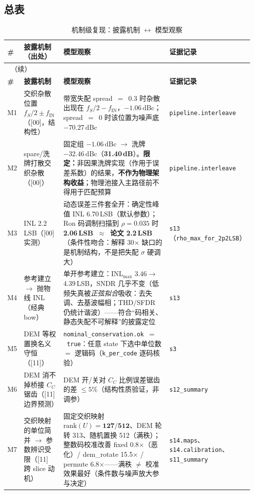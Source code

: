 \documentclass[11pt,a4paper,fontset=fandol]{ctexart}
\newcommand{\rec}[1]{\texttt{#1}}
\newcommand{\dBc}{\ensuremath{\,\mathrm{dBc}}}
\begin{document}
\subsection{总表}

\begingroup\footnotesize\sloppy
\setlength{\tabcolsep}{4pt}
\begin{longtable}{@{}p{0.7cm}p{4.6cm}p{6.2cm}p{3.4cm}@{}}
\caption{机制级复现：披露机制 $\leftrightarrow$ 模型观察}\label{tab:mech}\\
\toprule
\textbf{\#} & \textbf{披露机制（出处）} & \textbf{模型观察} & \textbf{证据记录}\\
\midrule
\endfirsthead
\multicolumn{4}{l}{\tablename~\thetable{}（续）}\\
\toprule
\textbf{\#} & \textbf{披露机制} & \textbf{模型观察} & \textbf{证据记录}\\
\midrule
\endhead
\bottomrule
\endfoot
M1 & 交织杂散位置 $f_S/2\pm f_{\mathrm{IN}}$（[00]，结构性） & 带宽失配 spread~$=$~0.3 时杂散出现在 $f_S/2-f_{\mathrm{IN}}$，$-1.06\dBc$；spread~$=$~0 时该位置为噪声底 $-70.27\dBc$ & \rec{pipeline.interleave}\\
M2 & spare/洗牌打散交织杂散（[00]） & 固定组 $-1.06\dBc$ $\to$ 洗牌 $-32.46\dBc$（\textbf{31.40\,dB}）。{\bfseries 限定：}非因果洗牌实现（作用于误差系数）的结果，\textbf{不作为物理架构收益}；物理池接入主路径前不得用于匹配预算 & \rec{pipeline.interleave}\\
M3 & INL 2.2\,LSB（[00] 实测） & 动态误差三件套全开：确定性峰值 INL 6.70\,LSB（默认参数）；Ron 码调制扫描到 $\rho=0.035$ 时 \textbf{2.06\,LSB~$\approx$~论文 2.2\,LSB}（条件性吻合：解释 30$\times$ 缺口的是机制结构，不是把失配 $\sigma$ 硬调大） & \rec{s13}（\rec{rho\_max\_for\_2p2LSB}）\\
M4 & 参考建立 $\to$ 抛物线 INL（经典 bow） & 单开参考建立：INL$_{\max}$ 3.46$\to$4.39\,LSB，SNDR 几乎不变（低频失真被\emph{正弦拟合}吸收：去失调、去基波幅相；THD/SFDR 仍统计谐波）——符合``码相关、静态失配不可解释''的披露定位 & \rec{s13}\\
M5 & DEM 等权置换名义守恒（[11]） & \rec{nominal\_conservation.ok~$=$~true}：任意 state 下选中单位数 $=$ 逻辑码（\rec{k\_per\_code} 逐码核验） & \rec{s3}\\
M6 & DEM 消不掉桥接 $C_C$ 锯齿（[11] 边界预测） & DEM 开/关对 $C_C$ 比例误差锯齿的差 $\leq 5\%$（结构性质验证，非调参） & \rec{s12\_summary}\\
M7 & 交织映射的单位简并 $\to$ 参数辨识受限（[11] 跨 slice 动机） & 固定交织映射 $\mathrm{rank}(U)=\mathbf{127/512}$、DEM 轮转 313、随机置换 512（满秩）；整数码校准改善 fixed 0.8$\times$（恶化）/ dem\_rotate 15.5$\times$ / permute 6.8$\times$——满秩 $\neq$ 校准效果最好（条件数与噪声放大参与决定） & \rec{s14.maps}、\rec{s14.calibration}、\rec{s11\_summary}\\

\end{longtable}
\end{document}
